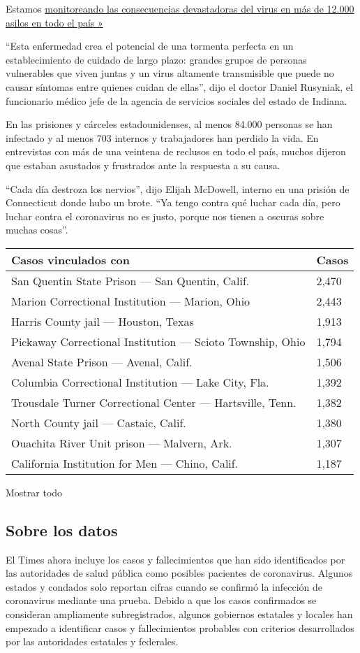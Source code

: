 Estamos
\href{https://www.nytimes.com/interactive/2020/us/coronavirus-nursing-homes.html}{monitoreando
las consecuencias devastadoras del virus en más de 12.000 asilos en todo
el país »}

``Esta enfermedad crea el potencial de una tormenta perfecta en un
establecimiento de cuidado de largo plazo: grandes grupos de personas
vulnerables que viven juntas y un virus altamente transmisible que puede
no causar síntomas entre quienes cuidan de ellas'', dijo el doctor
Daniel Rusyniak, el funcionario médico jefe de la agencia de servicios
sociales del estado de Indiana.

En las prisiones y cárceles estadounidenses, al menos 84.000 personas se
han infectado y al menos 703 internos y trabajadores han perdido la
vida. En entrevistas con más de una veintena de reclusos en todo el
país, muchos dijeron que estaban asustados y frustrados ante la
respuesta a su causa.

``Cada día destroza los nervios'', dijo Elijah McDowell, interno en una
prisión de Connecticut donde hubo un brote. ``Ya tengo contra qué luchar
cada día, pero luchar contra el coronavirus no es justo, porque nos
tienen a oscuras sobre muchas cosas''.

\begin{longtable}[]{@{}ll@{}}
\toprule
Casos vinculados con & Casos\tabularnewline
\midrule
\endhead
San Quentin State Prison --- San Quentin, Calif. & 2,470 \tabularnewline
Marion Correctional Institution --- Marion, Ohio & 2,443 \tabularnewline
Harris County jail --- Houston, Texas & 1,913 \tabularnewline
Pickaway Correctional Institution --- Scioto Township, Ohio & 1,794
\tabularnewline
Avenal State Prison --- Avenal, Calif. & 1,506 \tabularnewline
Columbia Correctional Institution --- Lake City, Fla. & 1,392
\tabularnewline
Trousdale Turner Correctional Center --- Hartsville, Tenn. & 1,382
\tabularnewline
North County jail --- Castaic, Calif. & 1,380 \tabularnewline
Ouachita River Unit prison --- Malvern, Ark. & 1,307 \tabularnewline
California Institution for Men --- Chino, Calif. & 1,187 \tabularnewline
\bottomrule
\end{longtable}

Mostrar todo

\hypertarget{sobre-los-datos}{%
\subsection{Sobre los datos}\label{sobre-los-datos}}

El Times ahora incluye los casos y fallecimientos que han sido
identificados por las autoridades de salud pública como posibles
pacientes de coronavirus. Algunos estados y condados solo reportan
cifras cuando se confirmó la infección de coronavirus mediante una
prueba. Debido a que los casos confirmados se consideran ampliamente
subregistrados, algunos gobiernos estatales y locales han empezado a
identificar casos y fallecimientos probables con criterios desarrollados
por las autoridades estatales y federales.

